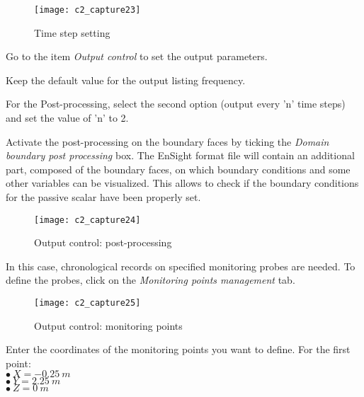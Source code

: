 \begin{figure}[h!]
\begin{center}
\texttt{[image: c2\_capture23]}
\caption{Time step setting}
\label{fig23_e2}
\end{center}
\end{figure}


\newpage
Go to the item {\itshape Output control} to set the output parameters.

Keep the default value for the output listing frequency.

For the Post-processing, select the second option (output every 'n' time steps)
and set the value of 'n' to 2.

Activate the post-processing on the boundary faces by ticking the
{\itshape Domain boundary post processing} box. The EnSight format file will
contain an additional part, composed of the boundary faces, on which boundary
conditions and some other variables can be visualized. This allows to check if
the boundary conditions for the passive scalar have been properly set.

\begin{figure}[h!]
\begin{center}
\texttt{[image: c2\_capture24]}
\caption{Output control: post-processing}
\label{fig24_e2}
\end{center}
\end{figure}


\newpage
In this case, chronological records on specified monitoring probes are needed.
To define the probes, click on the
{\itshape Monitoring points management} tab.

\begin{figure}[h!]
\begin{center}
\texttt{[image: c2\_capture25]}
\caption{Output control: monitoring points}
\label{fig25_e2}
\end{center}
\end{figure}



\newpage
Enter the coordinates of the monitoring points you want to define. For the first point:\\
\hspace*{1cm}$\bullet\ X = -0.25\ m$\\
\hspace*{1cm}$\bullet\ Y = 2.25\ m$\\
\hspace*{1cm}$\bullet\ Z = 0\ m$

